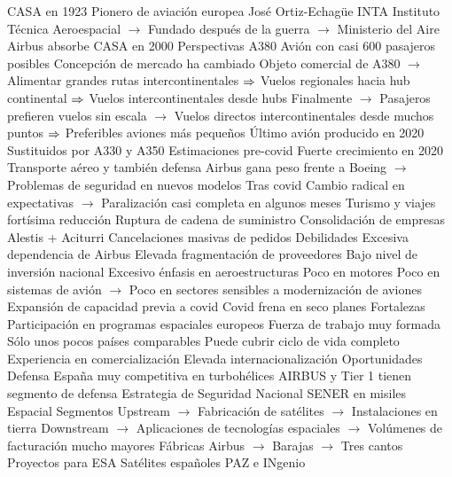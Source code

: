 \documentclass{nuevotema}
\begin{document}
\begin{esquemal}
				\4 CASA en 1923
				\4[] Pionero de aviación europea
				\4[] José Ortiz-Echagüe
				\4 INTA
				\4[] Instituto Técnica Aeroespacial
				\4[] $\to$ Fundado después de la guerra
				\4[] $\to$ Ministerio del Aire
				\4 Airbus absorbe CASA en 2000
			\3 Perspectivas
				\4 A380
				\4[] Avión con casi 600 pasajeros posibles
				\4[] Concepción de mercado ha cambiado
				\4[] Objeto comercial de A380
				\4[] $\to$ Alimentar grandes rutas intercontinentales
				\4[] $\Rightarrow$ Vuelos regionales hacia hub continental
				\4[] $\Rightarrow$ Vuelos intercontinentales desde hubs
				\4[] Finalmente
				\4[] $\to$ Pasajeros prefieren vuelos sin escala
				\4[] $\to$ Vuelos directos intercontinentales desde muchos puntos
				\4[] $\Rightarrow$ Preferibles aviones más pequeños
				\4[] Último avión producido en 2020
				\4[] Sustituidos por A330 y A350
				\4 Estimaciones pre-covid
				\4[] Fuerte crecimiento en 2020
				\4[] Transporte aéreo y también defensa
				\4[] Airbus gana peso frente a Boeing
				\4[] $\to$ Problemas de seguridad en nuevos modelos
				\4 Tras covid
				\4[] Cambio radical en expectativas
				\4[] $\to$ Paralización casi completa en algunos meses
				\4 Turismo y viajes fortísima reducción
				\4 Ruptura de cadena de suministro
				\4 Consolidación de empresas
				\4[] Alestis + Aciturri
				\4 Cancelaciones masivas de pedidos
			\3 Debilidades
				\4 Excesiva dependencia de Airbus
				\4 Elevada fragmentación de proveedores
				\4 Bajo nivel de inversión nacional
				\4 Excesivo énfasis en aeroestructuras
				\4[] Poco en motores
				\4[] Poco en sistemas de avión
				\4[] $\to$ Poco en sectores sensibles a modernización de aviones
				\4 Expansión de capacidad previa a covid
				\4[] Covid frena en seco planes
			\3 Fortalezas
				\4 Participación en programas espaciales europeos
				\4 Fuerza de trabajo muy formada
				\4[] Sólo unos pocos países comparables
				\4 Puede cubrir ciclo de vida completo
				\4 Experiencia en comercialización
				\4 Elevada internacionalización
			\3 Oportunidades
				\4
			\3 Defensa
				\4 España muy competitiva en turbohélices
				\4 AIRBUS y Tier 1 tienen segmento de defensa
				\4 Estrategia de Seguridad Nacional
				\4 SENER en misiles
			\3 Espacial
				\4 Segmentos
				\4[] Upstream
				\4[] $\to$ Fabricación de satélites
				\4[] $\to$ Instalaciones en tierra
				\4[] Downstream
				\4[] $\to$ Aplicaciones de tecnologías espaciales
				\4[] $\to$ Volúmenes de facturación mucho mayores
				\4 Fábricas
				\4[] Airbus
				\4[] $\to$ Barajas
				\4[] $\to$ Tres cantos
				\4[] Proyectos para ESA
				\4[] Satélites españoles PAZ e INgenio

\end{esquemal}
\end{document}
